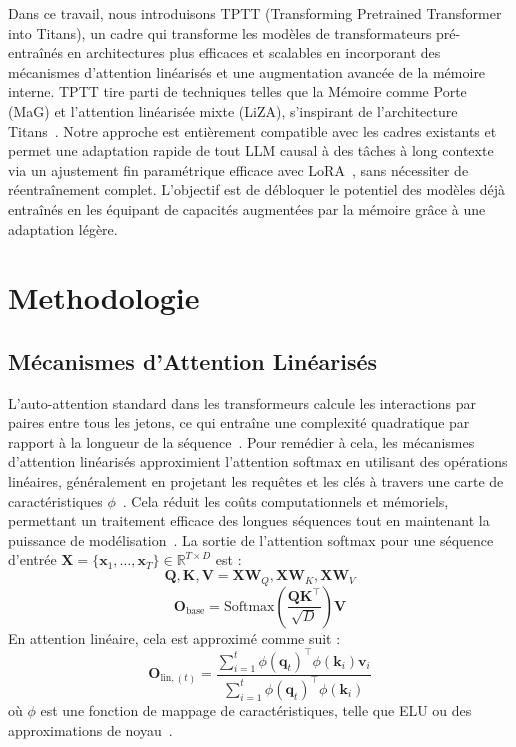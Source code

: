 \documentclass[10pt,a4paper]{article}
\begin{document}
Dans ce travail, nous introduisons TPTT (Transforming Pretrained Transformer into Titans), un cadre qui transforme les modèles de transformateurs pré-entraînés en architectures plus efficaces et scalables en incorporant des mécanismes d'attention linéarisés et une augmentation avancée de la mémoire interne. TPTT tire parti de techniques telles que la Mémoire comme Porte (MaG) et l'attention linéarisée mixte (LiZA), s'inspirant de l'architecture Titans~\cite{behrouz2024titans}. Notre approche est entièrement compatible avec les cadres existants et permet une adaptation rapide de tout LLM causal à des tâches à long contexte via un ajustement fin paramétrique efficace avec LoRA~\cite{hu2022lora}, sans nécessiter de réentraînement complet. L'objectif est de débloquer le potentiel des modèles déjà entraînés en les équipant de capacités augmentées par la mémoire grâce à une adaptation légère.

\section{Methodologie}

\subsection{Mécanismes d'Attention Linéarisés}

L'auto-attention standard dans les transformeurs calcule les interactions par paires entre tous les jetons, ce qui entraîne une complexité quadratique par rapport à la longueur de la séquence~\cite{vaswani2017attention}. Pour remédier à cela, les mécanismes d'attention linéarisés approximient l'attention softmax en utilisant des opérations linéaires, généralement en projetant les requêtes et les clés à travers une carte de caractéristiques $\phi$~\cite{katharopoulos2020transformers, wang2020linformer, mercat2024linearizing, yang2024parallelizing}. Cela réduit les coûts computationnels et mémoriels, permettant un traitement efficace des longues séquences tout en maintenant la puissance de modélisation~\cite{gu2023mamba, dao2023flashattention, zhang2024lolcats, lan2025liger}. La sortie de l'attention softmax pour une séquence d'entrée $\mathbf{X} = \{\mathbf{x}_1, \dots, \mathbf{x}_T\} \in \mathbb{R}^{T \times D}$ est :
\begin{equation}
\mathbf{Q}, \mathbf{K}, \mathbf{V} = \mathbf{X}\mathbf{W}_Q, \mathbf{X}\mathbf{W}_K, \mathbf{X}\mathbf{W}_V
\end{equation}
\begin{equation}
\mathbf{O}_{\text{base}} = \text{Softmax}\left(\frac{\mathbf{Q}\mathbf{K}^\top}{\sqrt{D}}\right)\mathbf{V}
\end{equation}
En attention linéaire, cela est approximé comme suit :
\begin{equation}
\mathbf{O}_{\text{lin}, (t)} = \frac{\sum_{i=1}^{t} \phi(\mathbf{q}_t)^\top \phi(\mathbf{k}_i) \mathbf{v}_i}{\sum_{i=1}^{t} \phi(\mathbf{q}_t)^\top \phi(\mathbf{k}_i)}
\end{equation}
où $\phi$ est une fonction de mappage de caractéristiques, telle que ELU ou des approximations de noyau~\cite{wang2020linformer}.
\end{document}
